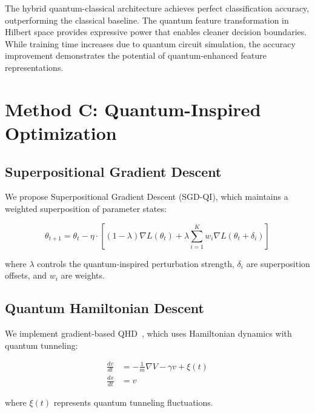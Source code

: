 \documentclass[11pt,a4paper]{article}
\begin{document}
The hybrid quantum-classical architecture achieves perfect classification accuracy, outperforming the classical baseline. The quantum feature transformation in Hilbert space provides expressive power that enables cleaner decision boundaries. While training time increases due to quantum circuit simulation, the accuracy improvement demonstrates the potential of quantum-enhanced feature representations.

\section{Method C: Quantum-Inspired Optimization}

\subsection{Superpositional Gradient Descent}
We propose Superpositional Gradient Descent (SGD-QI), which maintains a weighted superposition of parameter states:

\begin{equation}
    \theta_{t+1} = \theta_t - \eta \cdot \left[ (1-\lambda) \nabla L(\theta_t) + \lambda \sum_{i=1}^{K} w_i \nabla L(\theta_t + \delta_i) \right]
\end{equation}

where $\lambda$ controls the quantum-inspired perturbation strength, $\delta_i$ are superposition offsets, and $w_i$ are weights.

\subsection{Quantum Hamiltonian Descent}
We implement gradient-based QHD~\cite{leng2025}, which uses Hamiltonian dynamics with quantum tunneling:

\begin{align}
    \frac{dv}{dt} &= -\frac{1}{m}\nabla V - \gamma v + \xi(t) \\
    \frac{dx}{dt} &= v
\end{align}

where $\xi(t)$ represents quantum tunneling fluctuations.
\end{document}
